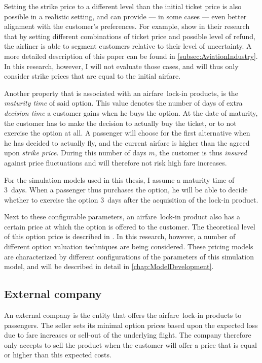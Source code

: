 Setting the strike price to a different level than the initial ticket price is also possible in a realistic setting, and can provide --- in some cases --- even better alignment with the customer's preferences. For example,  show in their research that by setting different combinations of ticket price and possible level of refund, the airliner is able to segment customers relative to their level of uncertainty. A more detailed description of this paper can be found in \autoref{subsec:AviationIndustry}. In this research, however, I will not evaluate those cases, and will thus only consider strike prices that are equal to the initial airfare.


Another property that is associated with an airfare~lock-in products, is the \emph{maturity time} of said option. This value denotes the number of days of extra \emph{decision time} a customer gains when he buys the option. At the date of maturity, the customer has to make the decision to actually buy the ticket, or to not exercise the option at all. A passenger will choose for the first alternative when he has decided to actually fly, and the current airfare is higher than the agreed upon \emph{strike price}. During this number of days $m$, the customer is thus \emph{insured} against price fluctuations and will therefore not risk high fare increases.

For the simulation models used in this thesis, I assume a maturity time of 3~days. When a passenger thus purchases the option, he will be able to decide whether to exercise the option 3~days after the acquisition of the lock-in product.

Next to these configurable parameters, an airfare~lock-in product also has a certain price at which the option is offered to the customer. The theoretical level of this option price is described in . In this research, however, a number of different option valuation techniques are being considered. These pricing models are characterized by different configurations of the parameters of this simulation model, and will be described in detail in \autoref{chap:ModelDevelopment}.


\subsection{External company}
An external company is the entity that offers the airfare~lock-in products to passengers. The seller sets its minimal option prices based upon the expected loss due to fare increases or sell-out of the underlying flight. The company therefore only accepts to sell the product when the customer will offer a price that is equal or higher than this expected costs.

